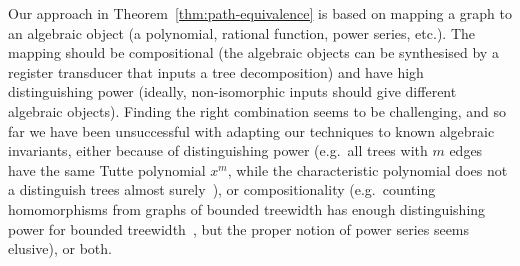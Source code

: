 
 Our approach in Theorem~\ref{thm:path-equivalence} is based on mapping a graph to an algebraic object (a polynomial, rational function, power series, etc.). The mapping should be compositional  (the algebraic objects can be synthesised by a register transducer that inputs a tree decomposition) and have high distinguishing power (ideally, non-isomorphic inputs should give different algebraic objects).  Finding the right combination seems to be challenging, and so far we have been unsuccessful with adapting our techniques to  known algebraic invariants, either because of  distinguishing power (e.g.~all trees with $m$ edges have the same  Tutte polynomial $x^m$, while  the characteristic polynomial does not a distinguish trees almost surely~\cite[Theorem 8]{schwenk1973almost}), or compositionality (e.g.~counting homomorphisms from graphs of bounded treewidth has enough distinguishing power for bounded treewidth~\cite[Theorem 4]{groheDellRattan2018}, but the proper notion of power series seems elusive), or both.   
